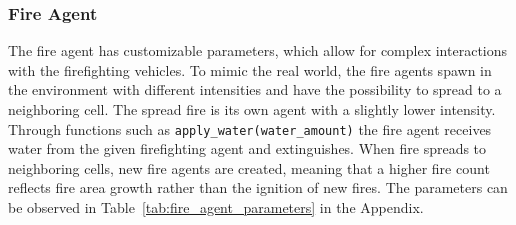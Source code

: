 \documentclass[11pt, a4paper]{article}
\begin{document}
\subsubsection{Fire Agent}
\label{sec:FireAgent}

The fire agent has customizable parameters, which allow for complex interactions with the firefighting vehicles. To mimic the real world, the fire agents spawn in the environment with different intensities and have the possibility to spread to a neighboring cell. The spread fire is its own agent with a slightly lower intensity. Through functions such as \texttt{apply\_water(water\_amount)} the fire agent receives water from the given firefighting agent and extinguishes. When fire spreads to neighboring cells, new fire agents are created, meaning that a higher fire count reflects fire area growth rather than the ignition of new fires. The parameters can be observed in Table~\ref{tab:fire_agent_parameters} in the Appendix.
\end{document}
